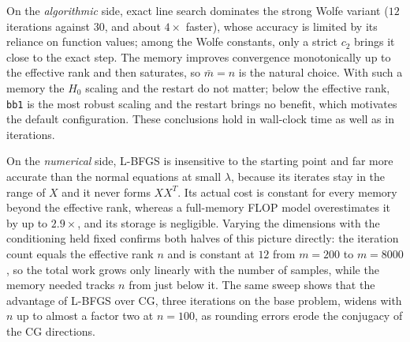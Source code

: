 \noindent On the \emph{algorithmic} side, exact line search dominates the strong
Wolfe variant ($12$ iterations against $30$, and about $4\times$ faster), whose
accuracy is limited by its reliance on function values; among the Wolfe
constants, only a strict $c_2$ brings it close to the exact step. The memory
improves convergence monotonically up to the effective rank and then
saturates, so $\bar m = n$ is the natural choice. With such a memory the
$H_0$ scaling and the restart do not matter; below the effective rank,
\texttt{bb1} is the most robust scaling and the restart brings no benefit,
which motivates the default configuration. These conclusions hold in
wall-clock time as well as in iterations.

\noindent On the \emph{numerical} side, L-BFGS is insensitive to the starting
point and far more accurate than the normal equations at small $\lambda$,
because its iterates stay in the range of $X$ and it never forms $XX^T$. Its
actual cost is constant for every memory beyond the effective rank, whereas a
full-memory FLOP model overestimates it by up to $2.9\times$, and its storage
is negligible. Varying the dimensions with the conditioning held fixed
confirms both halves of this picture directly: the iteration count equals the
effective rank $n$ and is constant at $12$ from $m = 200$ to $m = 8000$, so
the total work grows only linearly with the number of samples, while the
memory needed tracks $n$ from just below it. The same sweep shows that the
advantage of L-BFGS over CG, three iterations on the base problem, widens
with $n$ up to almost a factor two at $n = 100$, as rounding errors erode the
conjugacy of the CG directions.